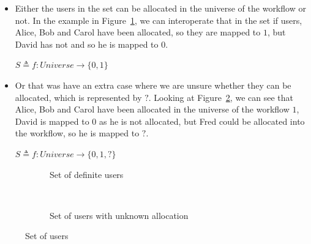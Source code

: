 \documentclass[a4paper]{report}
\begin{document}
\begin{itemize}
\item Either the users in the set can be allocated in the universe of the workflow or not. In the example in Figure~\ref{fig:Set of definite users}, we can interoperate that in the set if users, Alice, Bob and Carol have been allocated, so they are mapped to $1$, but David has not and so he is mapped to $0$.
\begin{center}
$ S \triangleq f : Universe \longrightarrow \{0, 1\}$
\end{center}
\item Or that was have an extra case where we are unsure whether they can be allocated, which is represented by $?$. Looking at Figure~\ref{fig:Set of users with unknown allocation}, we can see that Alice, Bob and Carol have been allocated in the universe of the workflow $1$, David is mapped to $0$ as he is not allocated, but Fred could be allocated into the workflow, so he is mapped to $?$. 
\begin{center}
$ S \triangleq f : Universe \longrightarrow \{0, 1, ?\}$
\end{center}
\end{itemize}

\begin{figure}[!h]
\centering
\begin{subfigure}[b]{\textwidth}
\centering
{}
\caption{Set of definite users}
\label{fig:Set of definite users}
\end{subfigure} \\
\begin{subfigure}[b]{\textwidth}
\centering
{}
\caption{Set of users with unknown allocation}
\label{fig:Set of users with unknown allocation}
\end{subfigure}
\caption{Set of users}
\label{fig:Set of Users}
\end{figure}
\end{document}
